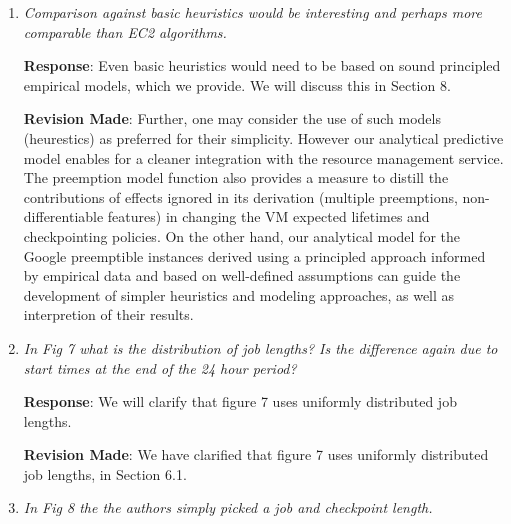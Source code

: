 \documentclass{article}
\newcommand{\resp}[1]{\textbf{Response}: #1}
\newcommand{\revmade}[1]{\textbf{Revision Made}: #1}
\begin{document}
\begin{enumerate}
  \resp{We will clarify this weak assumption in Sections 4.2 and 4.3---none of our policies require accurate job running time estimates. We will also briefly describe scenarios in which estimates are easy to obtain, such as parameter sweeps in scientific simulations. 
    For the job scheduling policy in Section 4.2, since we only \emph{compare} the benefits of VM reuse, we need only rough estimates of job running times, and exact times are not required. 
    Similarly, the checkpointing policy is not affected  if the job finishes before the estimated time. If the job takes more time, the checkpointing schedule ``rolls around'' and again provides the same checkpointing overhead.}

  \revmade{We have added text in Section 4.1 about the need for only rough estimates of job running time for the scheduling policy.}

\item \emph{Comparison against basic heuristics would be interesting and perhaps more comparable than EC2 algorithms.}

\resp{Even basic heuristics would need to be based on sound principled empirical models, which we provide. We will discuss this in Section 8.}

\revmade{Further, one may consider the use of such models (heurestics) as preferred for their simplicity. However our analytical predictive model enables for a cleaner integration with the resource management service. The preemption model function also provides a measure to distill the contributions of effects ignored in its derivation (multiple preemptions, non-differentiable features) in changing the VM expected lifetimes and checkpointing policies. On the other hand, our analytical model for the Google preemptible instances derived using a principled approach informed by empirical data and based on well-defined assumptions can guide the development of simpler heuristics and modeling approaches, as well as interpretion of their results.}

\item \emph{In Fig 7 what is the distribution of job lengths? Is the difference again due to start times at the end of the 24 hour period?}

\resp{We will clarify that figure 7 uses uniformly distributed job lengths.}

\revmade{We have clarified that figure 7 uses uniformly distributed job lengths, in Section 6.1.}

\item \emph{In Fig 8 the the authors simply picked a job and checkpoint length.}


\end{enumerate}
\end{document}
